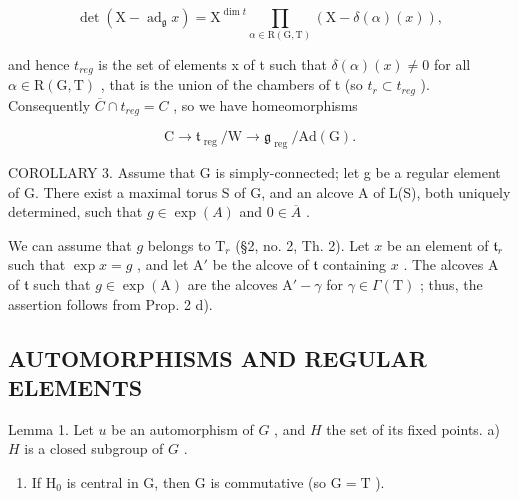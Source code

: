 \[
\det (\mathrm{X} - \operatorname{ad} _ {\mathfrak {g}} x) = \mathrm{X} ^ {\dim t} \prod_ {\alpha \in \mathrm{R(G,T)}} (\mathrm{X} - \delta (\alpha) (x)),
\]

and hence \(t_{reg}\) is the set of elements x of t such that \(\delta(\alpha)(x) \neq 0\) for all \(\alpha \in \mathrm{R}(\mathrm{G}, \mathrm{T})\) , that is the union of the chambers of t (so \(t_r \subset t_{reg}\) ). Consequently \(\overline{C} \cap t_{reg} = C\) , so we have homeomorphisms

\[
\mathrm{C} \rightarrow \mathfrak {t} _ {\text { reg }} / \mathrm{W} \rightarrow \mathfrak {g} _ {\text { reg }} / \mathrm{Ad} (\mathrm{G}).
\]

COROLLARY 3. Assume that G is simply-connected; let g be a regular element of G. There exist a maximal torus S of G, and an alcove A of L(S), both uniquely determined, such that \(g \in \exp(A)\) and \(0 \in \overline{A}\) .

We can assume that \(g\) belongs to \(\mathrm{T}_r\) (§2, no. 2, Th. 2). Let \(x\) be an element of \(\mathfrak{t}_r\) such that \(\exp x = g\) , and let \(\mathrm{A}'\) be the alcove of \(\mathfrak{t}\) containing \(x\) . The alcoves \(\mathrm{A}\) of \(\mathfrak{t}\) such that \(g \in \exp(\mathrm{A})\) are the alcoves \(\mathrm{A}' - \gamma\) for \(\gamma \in \Gamma(\mathrm{T})\) ; thus, the assertion follows from Prop. 2 d).

\subsection{AUTOMORPHISMS AND REGULAR ELEMENTS}

Lemma 1. Let \(u\) be an automorphism of \(G\) , and \(H\) the set of its fixed points. a) \(H\) is a closed subgroup of \(G\) .

\begin{enumerate}
\def\labelenumi{\alph{enumi})}
\setcounter{enumi}{1}
\tightlist
\item
  If \(\mathrm{H}_0\) is central in G, then G is commutative (so \(\mathrm{G} = \mathrm{T}\) ).
\end{enumerate}

